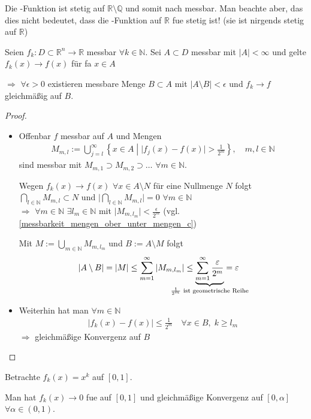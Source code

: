 \begin{underlinedenvironment}[Hinweis]
	Die -Funktion ist stetig auf $\mathbb{R}\setminus\mathbb{Q}$ und somit nach  messbar. Man beachte aber, das dies nicht bedeutet, dass die -Funktion auf $\mathbb{R}$ \gls{fue} stetig ist! (sie ist nirgends stetig auf $\mathbb{R}$)
\end{underlinedenvironment}

\begin{lemma}[Egorov]
	Seien $f_k:D\subset\mathbb{R}^n\to\mathbb{R}$ messbar $\forall k\in\mathbb{N}$. Sei $A\subset D$ messbar mit $\vert A \vert < \infty$ und gelte $f_k(x)\to f(x)$ für \gls{fa} $x\in A$
	
	$\Rightarrow$ $\forall \epsilon > 0$ existieren messbare Menge $B\subset A$ mit $\vert A \setminus B \vert < \epsilon$ und $f_k \to f$ gleichmäßig auf $B$.
\end{lemma}

\begin{proof}\hspace*{0pt}
	\begin{itemize}[topsep=\dimexpr -\baselineskip / 2 \relax]
	\item 
	Offenbar $f$ messbar auf $A$ und Mengen \begin{align*}
		M_{m,l} := \bigcup_{j=l}^\infty \left\{ x\in A \;\left| \; \vert f_j(x) - f(x)\vert > \frac{1}{2^m} \right. \right\},\quad m,l\in\mathbb{N}
	\end{align*}
	sind messbar mit $M_{m,1} \supset M_{m,2} \supset \dotsc$ $\forall m\in\mathbb{N}$.
	
	Wegen $f_k(x) \to f(x)$ $\forall x\in A\setminus N$ für eine Nullmenge $N$ folgt $\bigcap_{l\in\mathbb{N}} M_{m,l} \subset N$ und $\vert \bigcap_{l\in\mathbb{N}} M_{m,l} \vert = 0$ $\forall m\in\mathbb{N}$ \\
	$\Rightarrow$ $\forall m\in\mathbb{N}$ $\exists l_m \in\mathbb{N}$ mit $\vert M_{m,l_m} \vert < \frac{\epsilon}{2^m}$ (vgl.  \ref{messbarkeit_mengen_ober_unter_mengen_c})
	
	Mit $M:=\bigcup_{m\in\mathbb{N}} M_{m,l_m}$ und $B:= A\setminus M$ folgt \begin{align*}
		\vert A \setminus B \vert &= \vert M \vert \le \sum_{m=1}^\infty \vert M_{m,l_m} \vert \le \underbrace{\sum_{m=1}^\infty \frac{\epsilon}{2^m}}_{\mathclap{\frac{1}{2^m}\text{ ist geometrische Reihe}}} = \epsilon
	\end{align*}
	\item Weiterhin hat man $\forall m\in\mathbb{N}$ \begin{align*}
		\vert f_k(x) - f(x) \vert \le \frac{1}{2^m}\quad\forall x\in B,\;k \ge l_m
	\end{align*}
	$\Rightarrow$ gleichmäßige Konvergenz auf $B$
	\end{itemize}
\end{proof}

\begin{example}
	Betrachte $f_k(x) = x^k$ auf $[0,1]$.
	
	Man hat $f_k(x) \to 0$ \gls{fue} auf $[0,1]$ und gleichmäßige Konvergenz auf $[0,\alpha]$ $\forall \alpha\in (0,1)$.
\end{example}
